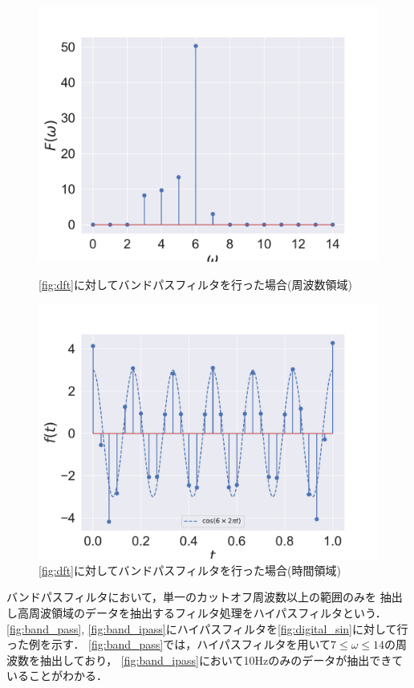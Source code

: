 \iffigure
\begin{figure}[h]
    \centering
  \begin{minipage}{.45\hsize}
    \includegraphics[clip, width=\textwidth]{figure/band_pass_dft.pdf}
    \caption{\autoref{fig:dft}に対してバンドパスフィルタを行った場合(周波数領域)}
    \label{fig:band_pass}
  \end{minipage}
  \begin{minipage}{.45\hsize}
    \includegraphics[clip, width=\textwidth]{figure/band_pass_idft.pdf}
    \caption{\autoref{fig:dft}に対してバンドパスフィルタを行った場合(時間領域)}
    \label{fig:band_ipass}
  \end{minipage}
\end{figure}
\fi
バンドパスフィルタにおいて，単一のカットオフ周波数以上の範囲のみを
抽出し高周波領域のデータを抽出するフィルタ処理をハイパスフィルタという．
\autoref{fig:band_pass}, \autoref{fig:band_ipass}にハイパスフィルタを\autoref{fig:digital_sin}に対して行った例を示す．
\autoref{fig:band_pass}では，ハイパスフィルタを用いて$7 \le \omega \le 14$の周波数を抽出しており，
\autoref{fig:band_ipass}において10Hzのみのデータが抽出できていることがわかる．

